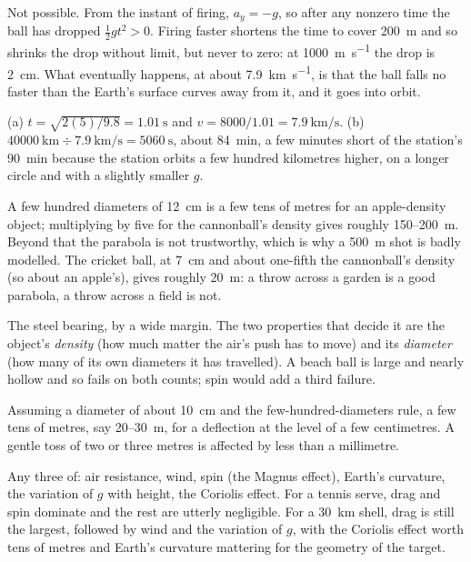 \documentclass[11pt,twoside,openany]{book}
\begin{document}
\begin{description}[leftmargin=2.6em,itemsep=3pt,style=sameline]
  \item[3.44] Not possible. From the instant of firing, $a_y = -g$, so after any nonzero time the ball has dropped $\tfrac12 gt^2 > 0$. Firing faster shortens the time to cover \SI{200}{\metre} and so shrinks the drop without limit, but never to zero: at \SI{1000}{\metre\per\second} the drop is \SI{2}{\centi\metre}. What eventually happens, at about \SI{7.9}{\kilo\metre\per\second}, is that the ball falls no faster than the Earth's surface curves away from it, and it goes into orbit.
  \item[3.45] (a) $t = \sqrt{2(5)/9.8} = \SI{1.01}{\second}$ and $v = 8000/1.01 = \SI{7.9}{\kilo\metre\per\second}$. (b) $\SI{40000}{\kilo\metre} \div \SI{7.9}{\kilo\metre\per\second} = \SI{5060}{\second}$, about \SI{84}{\minute}, a few minutes short of the station's \SI{90}{\minute} because the station orbits a few hundred kilometres higher, on a longer circle and with a slightly smaller $g$.
  \item[3.46] A few hundred diameters of \SI{12}{\centi\metre} is a few tens of metres for an apple-density object; multiplying by five for the cannonball's density gives roughly \SI{150}{}--\SI{200}{\metre}. Beyond that the parabola is not trustworthy, which is why a \SI{500}{\metre} shot is badly modelled. The cricket ball, at \SI{7}{\centi\metre} and about one-fifth the cannonball's density (so about an apple's), gives roughly \SI{20}{\metre}: a throw across a garden is a good parabola, a throw across a field is not.
  \item[3.47] The steel bearing, by a wide margin. The two properties that decide it are the object's \emph{density} (how much matter the air's push has to move) and its \emph{diameter} (how many of its own diameters it has travelled). A beach ball is large and nearly hollow and so fails on both counts; spin would add a third failure.
  \item[3.48] Assuming a diameter of about \SI{10}{\centi\metre} and the few-hundred-diameters rule, a few tens of metres, say \SI{20}{}--\SI{30}{\metre}, for a deflection at the level of a few centimetres. A gentle toss of two or three metres is affected by less than a millimetre.
  \item[3.49] Any three of: air resistance, wind, spin (the Magnus effect), Earth's curvature, the variation of $g$ with height, the Coriolis effect. For a tennis serve, drag and spin dominate and the rest are utterly negligible. For a \SI{30}{\kilo\metre} shell, drag is still the largest, followed by wind and the variation of $g$, with the Coriolis effect worth tens of metres and Earth's curvature mattering for the geometry of the target.

\end{description}
\end{document}
